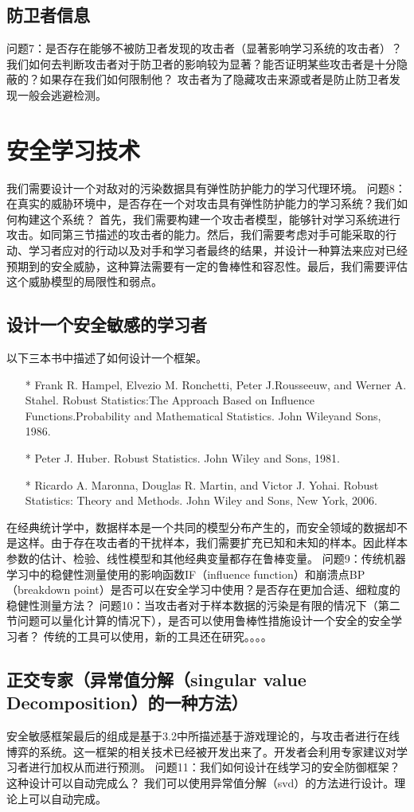 \documentclass[UTF8]{ctexart}
\begin{document}
    \subsection{防卫者信息}
	问题7：是否存在能够不被防卫者发现的攻击者（显著影响学习系统的攻击者）？我们如何去判断攻击者对于防卫者的影响较为显著？能否证明某些攻击者是十分隐蔽的？如果存在我们如何限制他？
    攻击者为了隐藏攻击来源或者是防止防卫者发现一般会逃避检测。
	\clearpage
	\section{安全学习技术}\label{sec:diwujie}
	我们需要设计一个对敌对的污染数据具有弹性防护能力的学习代理环境。
    问题8：在真实的威胁环境中，是否存在一个对攻击具有弹性防护能力的学习系统？我们如何构建这个系统？
    首先，我们需要构建一个攻击者模型，能够针对学习系统进行攻击。如同第三节描述的攻击者的能力。然后，我们需要考虑对手可能采取的行动、学习者应对的行动以及对手和学习者最终的结果，并设计一种算法来应对已经预期到的安全威胁，这种算法需要有一定的鲁棒性和容忍性。最后，我们需要评估这个威胁模型的局限性和弱点。
    \subsection{设计一个安全敏感的学习者}
    以下三本书中描述了如何设计一个框架。
    \begin{itemize}
	\item[*] Frank R. Hampel, Elvezio M. Ronchetti, Peter J.Rousseeuw, and Werner A. Stahel. Robust Statistics:The Approach Based on Influence Functions.Probability and Mathematical Statistics. John Wileyand Sons, 1986.
	\item[*] Peter J. Huber. Robust Statistics. John Wiley and Sons, 1981.
	\item[*] Ricardo A. Maronna, Douglas R. Martin, and Victor J. Yohai. Robust Statistics: Theory and Methods. John Wiley and Sons, New York, 2006.
	\end{itemize}
	在经典统计学中，数据样本是一个共同的模型分布产生的，而安全领域的数据却不是这样。由于存在攻击者的干扰样本，我们需要扩充已知和未知的样本。因此样本参数的估计、检验、线性模型和其他经典变量都存在鲁棒变量。
    问题9：传统机器学习中的稳健性测量使用的影响函数IF（influence function）和崩溃点BP（breakdown point）是否可以在安全学习中使用？是否存在更加合适、细粒度的稳健性测量方法？
    问题10：当攻击者对于样本数据的污染是有限的情况下（第二节问题可以量化计算的情况下），是否可以使用鲁棒性措施设计一个安全的安全学习者？
    传统的工具可以使用，新的工具还在研究。。。。
    \subsection{正交专家（异常值分解（singular value Decomposition）的一种方法）}
    安全敏感框架最后的组成是基于3.2中所描述基于游戏理论的，与攻击者进行在线博弈的系统。这一框架的相关技术已经被开发出来了。开发者会利用专家建议对学习者进行加权从而进行预测。
    问题11：我们如何设计在线学习的安全防御框架？这种设计可以自动完成么？
    我们可以使用异常值分解（svd）的方法进行设计。理论上可以自动完成。
	\clearpage
	
\end{document}
